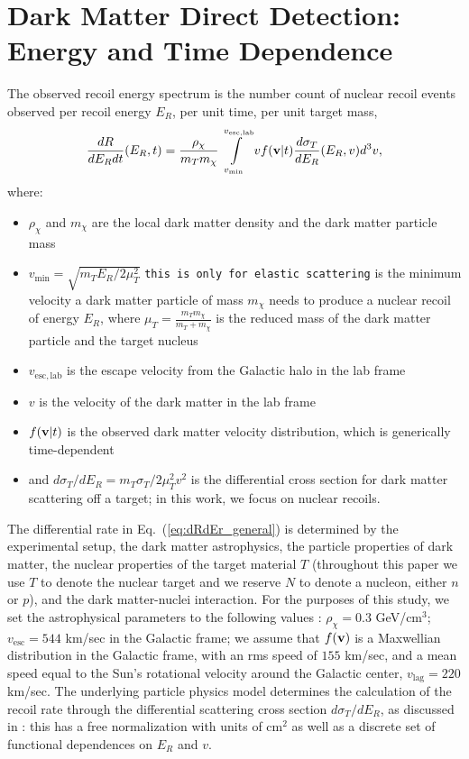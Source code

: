 \documentclass[11pt]{article}
\newcommand{\Eq}[1]{Eq.~(\ref{#1})} \newcommand{\Eqs}[2]{Eqs.~(\ref{#1}) and (\ref{#2})} \newcommand{\Eqm}[2]{Eqs.~(\ref{#1}) through (\ref{#2})}
\newcommand{\sjwColor}{red}
\newcommand{\sjwtt}[1]{{\color{\sjwColor}\tt #1}}
\begin{document}
\section{Dark Matter Direct Detection: Energy and Time Dependence}\label{sec:dd}

The observed recoil energy spectrum is the number count of nuclear recoil events observed per recoil energy $E_R$, per unit time, per unit target mass,
\begin{equation}
\frac{dR}{dE_R dt}(E_R,t) =  \frac{\rho_\chi}{m_T m_\chi} \int\limits_{v_{\mathrm{min}}}^{v_{\mathrm{esc, lab}}}  v f(\mathrm{\mbox{\bf{v}}}|t) \frac{d\sigma_T}{dE_R} (E_R,v) d^3v ,
\label{eq:dRdEr_general}
\end{equation}
where:
\begin{itemize}
\item $\rho_\chi$ and $m_\chi$ are the local dark matter density and the dark matter particle mass
\item $v_\mathrm{min} = \sqrt{m_T E_R/2\mu_T^2}$ \sjwtt{this is only for elastic scattering} is the minimum velocity a dark matter particle of mass $m_\chi$ needs to produce a nuclear recoil of energy $E_R$, where $\mu_T=\frac{m_Tm_\chi}{m_T+m_\chi}$ is the reduced mass of the dark matter particle and the target nucleus
\item $v_{\mathrm{esc, lab}}$ is the escape velocity from the Galactic halo in the lab frame
\item $v$ is the velocity of the dark matter in the lab frame
\item $f(\mathrm{\mbox{\bf{v}}}|t)$ is the observed dark matter velocity distribution, which is generically time-dependent
\item and $d\sigma_T/dE_R=m_T \sigma_T /2\mu_T^2 v^2$ is the differential cross section for dark matter scattering off a target; in this work, we focus on nuclear recoils.
\end{itemize}
The differential rate in \Eq{eq:dRdEr_general} is determined by the experimental setup, the dark matter astrophysics, the particle properties of dark matter, the nuclear properties of the target material $T$ (throughout this paper we use $T$ to denote the nuclear target and we reserve $N$ to denote a nucleon, either $n$ or $p$), and the dark matter-nuclei interaction. For the purposes of this study, we set the astrophysical parameters to the following values \cite{Bovy:2013raa}: $\rho_\chi=0.3$ GeV/cm$^3$; $v_{\mathrm{esc}} = 544$ km/sec in the Galactic frame; we assume that $f(\mathrm{\mbox{\bf{v}}})$ is a Maxwellian distribution in the Galactic frame, with an rms speed of $155$ km/sec, and a mean speed equal to the Sun's rotational velocity around the Galactic center, $v_\textrm{lag}=220$ km/sec. The underlying particle physics model determines the calculation of the recoil rate through the differential scattering cross section ${d\sigma_T}/{dE_R}$, as discussed in \cite{Gluscevic:2015sqa,Gresham:2014vja}: this has a free normalization with units of cm${}^2$ as well as a discrete set of functional dependences on $E_R$ and $v$.
\end{document}
